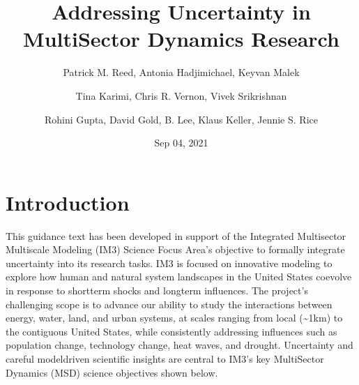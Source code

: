 \documentclass[a4paper,10pt,english]{book}
\title{\textbf{Addressing Uncertainty in MultiSector Dynamics Research}}
\date{Sep 04, 2021}
\author{Patrick M. Reed, Antonia Hadjimichael, Keyvan Malek\and Tina Karimi, Chris R. Vernon, Vivek Srikrishnan\and Rohini Gupta, David Gold, B. Lee, Klaus Keller, Jennie S. Rice}
\begin{document}
\pagestyle{empty}
\sphinxmaketitle
\pagestyle{plain}
\sphinxtableofcontents
\pagestyle{normal}
\label{\detokenize{index::doc}}



\chapter{Introduction}
\label{\detokenize{1_introduction:introduction}}\label{\detokenize{1_introduction:id1}}\label{\detokenize{1_introduction::doc}}
\sphinxAtStartPar
This guidance text has been developed in support of the Integrated Multisector Multiscale Modeling (IM3) Science Focus Area’s objective to formally integrate uncertainty into its research tasks. IM3 is focused on innovative modeling to explore how human and natural system landscapes in the United States co\sphinxhyphen{}evolve in response to short\sphinxhyphen{}term shocks and long\sphinxhyphen{}term influences. The project’s challenging scope is to advance our ability to study the interactions between energy, water, land, and urban systems, at scales ranging from local (\textasciitilde{}1km) to the contiguous United States, while consistently addressing influences such as population change, technology change, heat waves, and drought. Uncertainty and careful model\sphinxhyphen{}driven scientific insights are central to IM3’s key MultiSector Dynamics (MSD) science objectives shown below.

\sphinxAtStartPar
{}

\sphinxAtStartPar
{}

\sphinxAtStartPar
{}

\sphinxAtStartPar
{}
\end{document}
